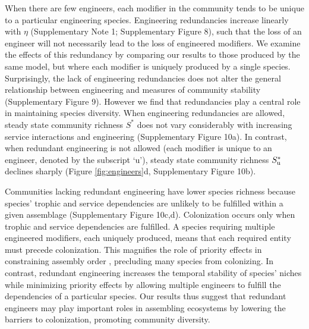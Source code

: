 \documentclass[twocolumn,preprintnumbers,amsmath,amssymb,superscriptaddress,linenumbers]{revtex4-1}
\begin{document}
When there are few engineers, each modifier in the community tends to be unique to a particular engineering species.
Engineering redundancies increase linearly with $\eta$ (Supplementary Note 1; Supplementary Figure 8), such that the loss of an engineer will not necessarily lead to the loss of engineered modifiers. %
We examine the effects of this redundancy by comparing our results to those produced by the same model, but where each modifier is uniquely produced by a single species.
Surprisingly, the lack of engineering redundancies does not alter the general relationship between engineering and measures of community stability (Supplementary Figure 9). %
However we find that redundancies play a central role in maintaining species diversity.
When engineering redundancies are allowed, steady state community richness $S^*$ does not vary considerably with increasing service interactions and engineering (Supplementary Figure 10a). %
In contrast, when redundant engineering is not allowed (each modifier is unique to an engineer, denoted by the subscript `u'), steady state community richness $S^*_{\rm u}$ declines sharply (Figure \ref{fig:engineers}d, Supplementary Figure 10b). %

Communities lacking redundant engineering have lower species richness because species' trophic and service dependencies are unlikely to be fulfilled within a given assemblage (Supplementary Figure 10c,d). %
Colonization occurs only when trophic and service dependencies are fulfilled.
A species requiring multiple engineered modifiers, each uniquely produced, means that each required entity must precede colonization.
This magnifies the role of priority effects in constraining assembly order \cite{Fukami2015}, precluding many species from colonizing.
In contrast, redundant engineering increases the temporal stability of species' niches while minimizing priority effects by allowing multiple engineers to fulfill the dependencies of a particular species.
Our results thus suggest that redundant engineers may play important roles in assembling ecosystems by lowering the barriers to colonization, promoting community diversity.\\
\end{document}
